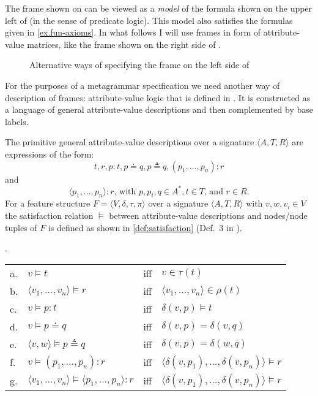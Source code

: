 The frame shown on  can be viewed
as a \emph{model} of the formula shown on the upper left of  (in the sense of predicate logic). This model also satisfies the formulas given in \ref{ex.fun-axioms}. In what follows I will use frames in form of attribute-value matrices, like the frame shown on the right side of .

\begin{figure}
%
\caption{Alternative ways of specifying the frame on the left side of
\label{fig-frame-example-II}}
\end{figure}

For the purposes of a metagrammar specification we need another way of description of frames: attribute-value logic that is defined in \citealt[Section~3.3.2]{KallmeyerOsswald:13}. It is constructed as a language of general attribute-value descriptions and then complemented by base labels.\pagebreak

The primitive general attribute-value descriptions over a signature $\langle A, T, R \rangle$ are expressions of the form: \[t, r, p : t, p \doteq q, p \triangleq q, (p_1, \ldots , p_n) : r\] and \[\langle p_1, \ldots , p_n \rangle : r \text{, with } p, p_i, q \in A^*, t \in T \text{, and }r \in R\text{.}\] For a feature structure $F = \langle V, \delta, \tau, \pi \rangle$ over a signature $\langle A, T, R \rangle$ with $v,w, v_i \in V$ the satisfaction relation $\models$ between attribute-value descriptions and nodes/node tuples of $F$ is defined as shown in \ref{def:satisfaction} (Def.~3 in \citealt{KallmeyerOsswald:13}).

\ex.\label{def:satisfaction}
\begin{tabular}[t]{@{}llll@{}}
a. & $v \models t$   & iff &  $v \in \tau (t)$\\
b. & $\langle v_1, \ldots , v_n \rangle \models r$   & iff &  $\langle v_1, \ldots , v_n \rangle \in \rho (t)$\\
c. & $v \models p : t$   & iff &  $\delta (v, p) \models t$\\
d. & $v \models p \doteq q$   & iff &  $\delta (v, p) = \delta (v, q)$\\
e. & $\langle v, w \rangle \models p \triangleq q$   & iff &  $\delta (v, p) = \delta (w, q)$\\
f. & $v \models (p_1, \ldots , p_n ) : r$   & iff &  $\langle \delta (v, p_1), \ldots , \delta (v, p_n) \rangle \models r$\\
g. & $\langle v_1, \ldots , v_n \rangle \models \langle p_1, \ldots , p_n \rangle : r$   & iff &  $\langle \delta (v, p_1), \ldots , \delta (v, p_n) \rangle \models r$
\end{tabular}

